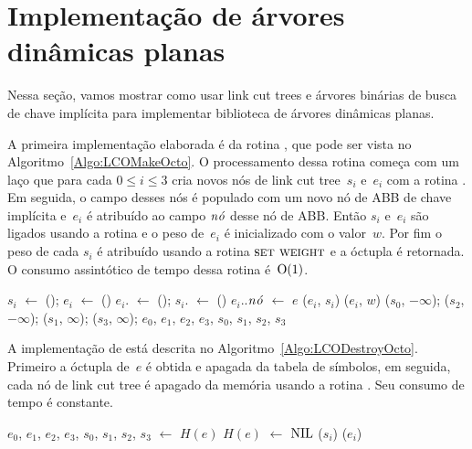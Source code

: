 \section{Implementação de árvores dinâmicas planas}
\label{sec:implementacao-ADP}

Nessa seção, vamos mostrar como usar link cut trees e árvores binárias de busca de chave implícita para implementar biblioteca de árvores dinâmicas planas.

A primeira implementação elaborada é da rotina \LCOMakeOcto{}, que pode ser vista no Algoritmo~\ref{Algo:LCOMakeOcto}.
O processamento dessa rotina começa com um laço que para cada $0\leq i\leq 3$ cria novos nós de link cut tree~$s_i$ e~$e_i$ com a rotina \linkcutCreate{}.
Em seguida, o campo  desses nós é populado com um novo nó de ABB de chave implícita e~$e_i$ é atribuído ao campo $\mathit{n\acute{o}}$ desse nó de ABB.
Então $s_i$ e~$e_i$ são ligados usando a rotina \linkcutAddEdge{} e o peso de~$e_i$ é inicializado com o valor~$w$.
Por fim o peso de cada $s_i$ é atribuído usando a rotina $\text{\scshape \text{\scshape set weight}}$ e a óctupla é retornada.
O consumo assintótico de tempo dessa rotina é~$\mathrm{O}(1)$.

\begin{algorithm}[htb]
\caption{\LCOMakeOcto($e$, $w$)}
\label{Algo:LCOMakeOcto}
\begin{algorithmic}[1]
  \State $s_i$ $\gets$ \linkcutCreate(); $e_i$ $\gets$ \linkcutCreate()
  \State $e_i$. $\gets$ \treapCreate(); $s_i$. $\gets$ \treapCreate()
  \State $e_i$..$\mathit{n\acute{o}}$ $\gets$ $e$
  \State \linkcutAddEdge($e_i$, $s_i$)
  \State \linkcutWeight($e_i$, $w$)
\EndFor
\State \linkcutWeight($s_0$, $-\infty$); \linkcutWeight($s_2$, $-\infty$);
\State \linkcutWeight($s_1$, $\infty$); \linkcutWeight($s_3$, $\infty$);
\State \Return $e_0$, $e_1$, $e_2$, $e_3$, $s_0$, $s_1$, $s_2$, $s_3$
\end{algorithmic}
\end{algorithm}

A implementação de \LCODestroyOcto{} está descrita no Algoritmo~\ref{Algo:LCODestroyOcto}.
Primeiro a óctupla de~$e$ é obtida e apagada da tabela de símbolos, em seguida, cada nó de link cut tree é apagado da memória usando a rotina \linkcutDestroy{}. Seu consumo de tempo é constante.
\begin{algorithm}[htb]
\caption{\LCODestroyOcto($H$, $e$)}
\label{Algo:LCODestroyOcto}
\begin{algorithmic}[1]
\State $e_0$, $e_1$, $e_2$, $e_3$, $s_0$, $s_1$, $s_2$, $s_3$ $\gets$ $H(e)$
\State $H(e)$ $\gets$ $\text{NIL}$
  \State \linkcutDestroy($s_i$)
  \State \linkcutDestroy($e_i$)
\EndFor
\end{algorithmic}
\end{algorithm}



